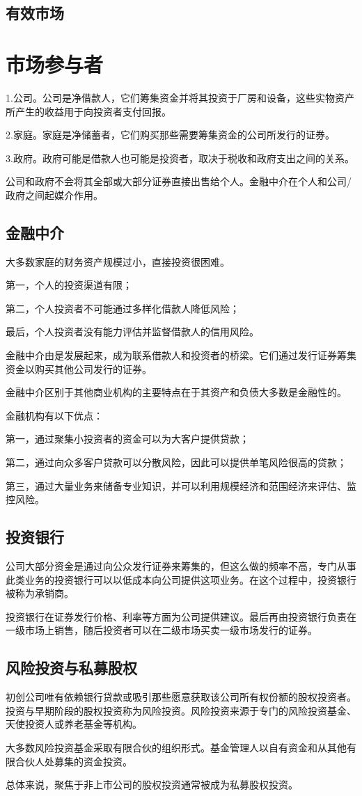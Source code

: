 \documentclass{article}
\begin{document}
\subsection{有效市场}

\section{市场参与者}
1.公司。公司是净借款人，它们筹集资金并将其投资于厂房和设备，这些实物资产所产生的收益用于向投资者支付回报。

2.家庭。家庭是净储蓄者，它们购买那些需要筹集资金的公司所发行的证券。

3.政府。政府可能是借款人也可能是投资者，取决于税收和政府支出之间的关系。

公司和政府不会将其全部或大部分证券直接出售给个人。金融中介在个人和公司/政府之间起媒介作用。

\subsection{金融中介}
大多数家庭的财务资产规模过小，直接投资很困难。

第一，个人的投资渠道有限；

第二，个人投资者不可能通过多样化借款人降低风险；

最后，个人投资者没有能力评估并监督借款人的信用风险。

金融中介由是发展起来，成为联系借款人和投资者的桥梁。它们通过发行证券筹集资金以购买其他公司发行的证券。

金融中介区别于其他商业机构的主要特点在于其资产和负债大多数是金融性的。

金融机构有以下优点：

第一，通过聚集小投资者的资金可以为大客户提供贷款；

第二，通过向众多客户贷款可以分散风险，因此可以提供单笔风险很高的贷款；

第三，通过大量业务来储备专业知识，并可以利用规模经济和范围经济来评估、监控风险。

\subsection{投资银行}
公司大部分资金是通过向公众发行证券来筹集的，但这么做的频率不高，专门从事此类业务的投资银行可以以低成本向公司提供这项业务。在这个过程中，投资银行被称为承销商。

投资银行在证券发行价格、利率等方面为公司提供建议。最后再由投资银行负责在一级市场上销售，随后投资者可以在二级市场买卖一级市场发行的证券。

\subsection{风险投资与私募股权}
初创公司唯有依赖银行贷款或吸引那些愿意获取该公司所有权份额的股权投资者。投资与早期阶段的股权投资称为风险投资。风险投资来源于专门的风险投资基金、天使投资人或养老基金等机构。

大多数风险投资基金采取有限合伙的组织形式。基金管理人以自有资金和从其他有限合伙人处募集的资金投资。

总体来说，聚焦于非上市公司的股权投资通常被成为私募股权投资。
\end{document}
